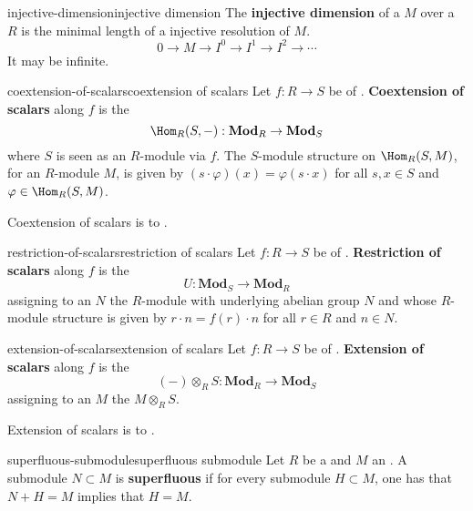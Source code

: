 \begin{topic}{injective-dimension}{injective dimension}
    The \textbf{injective dimension} of a  $M$ over a  $R$ is the minimal length of a injective resolution of $M$.
    \[ 0 \to M \to I^0 \to I^1 \to I^2 \to \cdots \]
    It may be infinite.
\end{topic}

\begin{topic}{coextension-of-scalars}{coextension of scalars}
    Let $f : R \to S$ be  of . \textbf{Coextension of scalars} along $f$ is the 
    \[ \Hom_R(S, -) : \textbf{Mod}_R \to \textbf{Mod}_S \]
    where $S$ is seen as an $R$-module via $f$. The $S$-module structure on $\Hom_R(S, M)$, for an $R$-module $M$, is given by $(s \cdot \varphi)(x) = \varphi(s \cdot x)$ for all $s, x \in S$ and $\varphi \in \Hom_R(S, M)$.
    
    Coextension of scalars is  to .
\end{topic}

\begin{topic}{restriction-of-scalars}{restriction of scalars}
    Let $f : R \to S$ be  of . \textbf{Restriction of scalars} along $f$ is the 
    \[ U : \textbf{Mod}_S \to \textbf{Mod}_R \]
    assigning to an  $N$ the $R$-module with underlying abelian group $N$ and whose $R$-module structure is given by $r \cdot n = f(r) \cdot n$ for all $r \in R$ and $n \in N$.
\end{topic}

\begin{topic}{extension-of-scalars}{extension of scalars}
    Let $f : R \to S$ be  of . \textbf{Extension of scalars} along $f$ is the 
    \[ (-) \otimes_R S : \textbf{Mod}_R \to \textbf{Mod}_S \]
    assigning to an  $M$ the  $M \otimes_R S$.
    
    Extension of scalars is  to .
\end{topic}

\begin{topic}{superfluous-submodule}{superfluous submodule}
    Let $R$ be a  and $M$ an . A submodule $N \subset M$ is \textbf{superfluous} if for every submodule $H \subset M$, one has that $N + H = M$ implies that $H = M$.
\end{topic}

